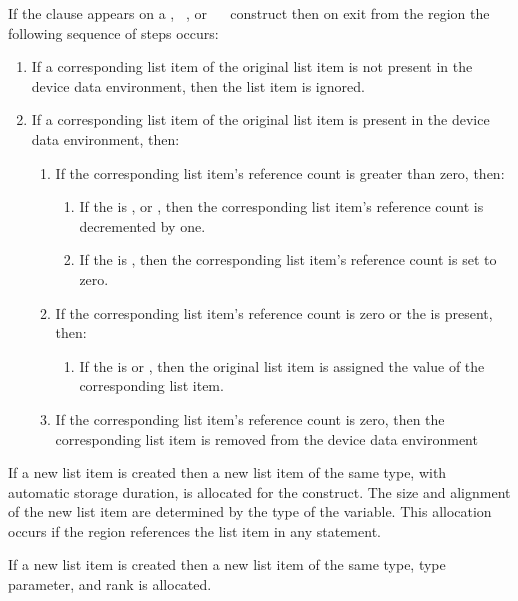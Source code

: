 {{{{If the  clause appears on a , ~, or ~~ construct then on exit from the region the following sequence of steps occurs:
\begin{enumerate}
\item If a corresponding list item of the original list item is not present in the device data environment, then the list item is ignored.
\item If a corresponding list item of the original list item is present in the device data environment, then:
\begin{enumerate}
\item If the corresponding list item's reference count is greater than zero, then:
\begin{enumerate}
\item If the  is ,  or , then the corresponding list item's reference count is decremented by one.
\item If the  is , then the corresponding list item's reference count is set to zero. 
\end{enumerate}
\item If the corresponding list item's reference count is zero or the   is present, then:
\begin{enumerate}
\item If the  is  or , then the original list item is assigned the value of the corresponding list item. 
\end{enumerate}
\item If the corresponding list item's reference count is zero, then the corresponding list item is removed from the device data environment 
\end{enumerate}
\end{enumerate}

\ccppspecificstart
If a new list item is created then a new list item of the same type, with automatic storage
duration, is allocated for the construct. The size and alignment of the new list
item are determined by the type of the variable. This allocation occurs if the region
references the list item in any statement.
\ccppspecificend

\fortranspecificstart
If a new list item is created then a new list item of the same type, type parameter, and
rank is allocated.
\fortranspecificend

}}}}
